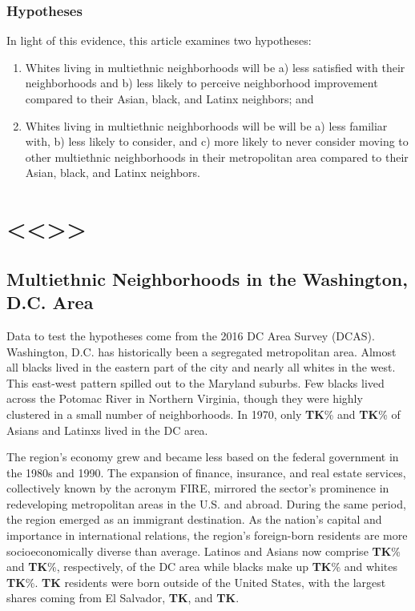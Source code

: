 \documentclass{baderart}
\providecommand{\tightlist}{%
  \setlength{\itemsep}{0pt}\setlength{\parskip}{0pt}}
\begin{document}
\subsubsection{Hypotheses}\label{hypotheses}

In light of this evidence, this article examines two hypotheses:

\begin{enumerate}
\def\labelenumi{\arabic{enumi}.}
\tightlist
\item
  Whites living in multiethnic neighborhoods will be a) less satisfied
  with their neighborhoods and b) less likely to perceive neighborhood
  improvement compared to their Asian, black, and Latinx neighbors; and
\item
  Whites living in multiethnic neighborhoods will be will be a) less
  familiar with, b) less likely to consider, and c) more likely to never
  consider moving to other multiethnic neighborhoods in their
  metropolitan area compared to their Asian, black, and Latinx
  neighbors.
\end{enumerate}

\section{\textless{}\textless{}\textgreater{}\textgreater{}}\label{section}

\subsection{Multiethnic Neighborhoods in the Washington, D.C.
Area}\label{multiethnic-neighborhoods-in-the-washington-d.c.-area}

Data to test the hypotheses come from the 2016 DC Area Survey (DCAS).
Washington, D.C. has historically been a segregated metropolitan area.
Almost all blacks lived in the eastern part of the city and nearly all
whites in the west. This east-west pattern spilled out to the Maryland
suburbs. Few blacks lived across the Potomac River in Northern Virginia,
though they were highly clustered in a small number of neighborhoods. In
1970, only \textbf{TK}\% and \textbf{TK}\% of Asians and Latinxs lived
in the DC area.

The region's economy grew and became less based on the federal
government in the 1980s and 1990. The expansion of finance, insurance,
and real estate services, collectively known by the acronym FIRE,
mirrored the sector's prominence in redeveloping metropolitan areas in
the U.S. and abroad. During the same period, the region emerged as an
immigrant destination. As the nation's capital and importance in
international relations, the region's foreign-born residents are more
socioeconomically diverse than average. Latinos and Asians now comprise
\textbf{TK}\% and \textbf{TK}\%, respectively, of the DC area while
blacks make up \textbf{TK}\% and whites \textbf{TK}\%. \textbf{TK}
residents were born outside of the United States, with the largest
shares coming from El Salvador, \textbf{TK}, and \textbf{TK}.
\end{document}

